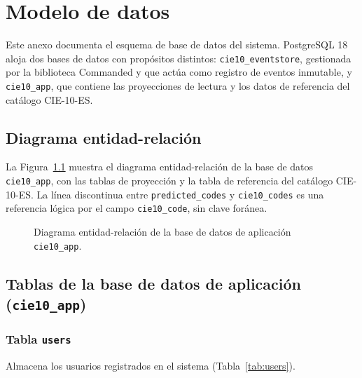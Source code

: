 \chapter{Modelo de datos}
\label{cap:AnexoD}

Este anexo documenta el esquema de base de datos del sistema. PostgreSQL 18 aloja dos bases de datos con propósitos distintos: \texttt{cie10\_eventstore}, gestionada por la biblioteca Commanded y que actúa como registro de eventos inmutable, y \texttt{cie10\_app}, que contiene las proyecciones de lectura y los datos de referencia del catálogo CIE-10-ES.

\section{Diagrama entidad-relación}

La Figura~\ref{fig:erd-bd} muestra el diagrama entidad-relación de la base de datos \texttt{cie10\_app}, con las tablas de proyección y la tabla de referencia del catálogo CIE-10-ES. La línea discontinua entre \texttt{predicted\_codes} y \texttt{cie10\_codes} es una referencia lógica por el campo \texttt{cie10\_code}, sin clave foránea.

\begin{figure}[ht]
\centering
\resizebox{\textwidth}{!}{}
\caption{Diagrama entidad-relación de la base de datos de aplicación \texttt{cie10\_app}.}
\label{fig:erd-bd}
\end{figure}

\section{Tablas de la base de datos de aplicación (\texttt{cie10\_app})}

\subsection{Tabla \texttt{users}}

Almacena los usuarios registrados en el sistema (Tabla~\ref{tab:users}).

